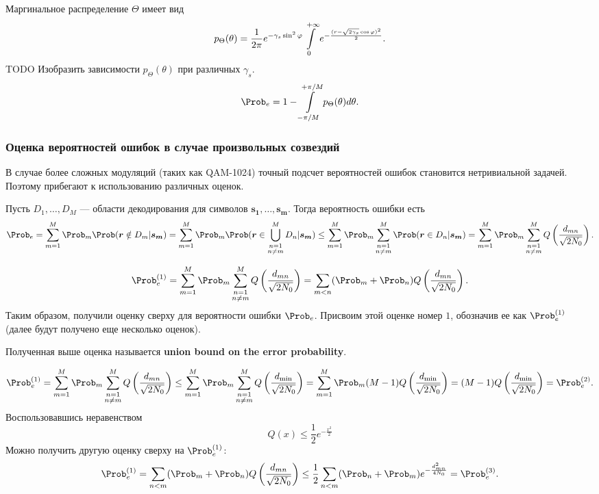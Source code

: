 \documentclass{book}
\numberwithin{theorem}{chapter}
\numberwithin{statement}{chapter}
\numberwithin{lemma}{chapter}
\theoremstyle{definition}
\numberwithin{task}{chapter}
\theoremstyle{remark}
\numberwithin{example}{chapter}
\theoremstyle{definition}
\numberwithin{definition}{chapter}
\theoremstyle{remark}
\theoremstyle{remark}
\numberwithin{lyrics}{section}
\begin{document}
Маргинальное распределение $\Theta$ имеет вид
$$
p_{\Theta}(\theta) = \frac{1}{2\pi}  e^{-\gamma_s \sin^2 \varphi} \int\limits_{0}^{+\infty} e^{-\frac{(r - \sqrt{2\gamma_s} \cos \varphi)^2}{2}}.
$$
TODO Изобразить зависимости $p_{\Theta}(\theta)$ при различных $\gamma_s$.
$$
\Prob_e = 1 - \Int_{-\pi / M}^{+\pi / M} p_{\Theta}(\theta) d\theta.
$$

\subsubsection{Оценка вероятностей ошибок в случае произвольных созвездий}
В случае более сложных модуляций (таких как QAM-1024) точный подсчет вероятностей ошибок становится нетривиальной задачей. Поэтому прибегают к использованию различных оценок.

Пусть $D_1,\dots,D_M$ --- области декодирования для символов $\bm{s_1}, \dots, \bm{s_m}$. Тогда вероятность ошибки есть
$$
\Prob_e = \Sum_{m = 1}^{M}\Prob_m \Prob(\bm{r} \notin D_m |\bm{s_m}) = \Sum_{m = 1}^{M}\Prob_m \Prob(\bm{r} \in \bigcup_{\substack{n=1\\n\neq m}}^{M} D_n |\bm{s_m}) \le \Sum_{m=1}^M \Prob_m \Sum_{\substack{n=1 \\ n\neq m}}^{M} \Prob(\bm{r} \in D_n|\bm{s_m}) = \Sum_{m=1}^M \Prob_m \Sum_{\substack{n=1 \\ n\neq m}}^{M} Q\left(\frac{d_{mn}}{\sqrt{2N_0}}\right).
$$

\begin{equation}
\label{eq:phy:const:pe1}
\Prob_e^{(1)} = \Sum_{m=1}^M \Prob_m \Sum_{\substack{n=1 \\ n\neq m}}^{M} Q\left(\frac{d_{mn}}{\sqrt{2N_0}}\right) 
= \Sum_{m < n} (\Prob_m + \Prob_n) Q\left(\frac{d_{mn}}{\sqrt{2N_0}}\right).
\end{equation}
Таким образом, получили оценку сверху для вероятности ошибки $\Prob_e$. Присвоим этой оценке номер $1$, обозначив ее как $\Prob_e^{(1)}$ (далее будут получено еще несколько оценок). 

Полученная выше оценка называется \textbf{union bound on the error pro\-ba\-bi\-lity}.

\begin{equation*}
\Prob_e^{(1)} = \Sum_{m=1}^M \Prob_m \Sum_{\substack{n=1 \\ n\neq m}}^{M} Q\left(\frac{d_{mn}}{\sqrt{2N_0}}\right) \le
\Sum_{m=1}^M \Prob_m \Sum_{\substack{n=1 \\ n\neq m}}^{M} Q\left(\frac{d_{\text{min}}}{\sqrt{2N_0}}\right) =
\Sum_{m=1}^M \Prob_m (M - 1) Q\left(\frac{d_{\text{min}}}{\sqrt{2N_0}}\right) =
(M - 1) Q\left(\frac{d_{\text{min}}}{\sqrt{2N_0}}\right) = \Prob_e^{(2)}.
\end{equation*}
Воспользовавшись неравенством 
$$
Q(x) \le \frac{1}{2} e^{-\frac{x^2}{2}}
$$ 
Можно получить другую оценку сверху на $\Prob_e^{(1)}$:
\begin{equation*}
\Prob_e^{(1)} = \Sum_{n < m} (\Prob_m + \Prob_n) Q\left(\frac{d_{mn}}{\sqrt{2N_0}}\right) \le \frac{1}{2} \Sum_{n < m} (\Prob_n + \Prob_m) e^{-\frac{d^2_{mn}}{4N_0}} = \Prob_e^{(3)}.
\end{equation*}
\end{document}
